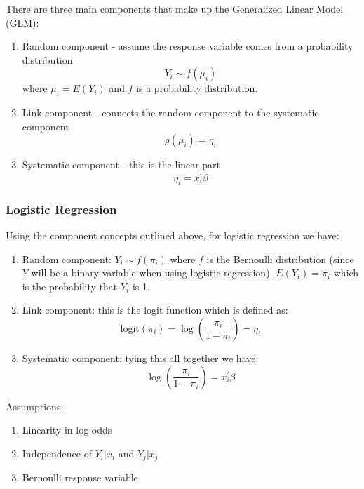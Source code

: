 
There are three main components that make up the Generalized Linear Model (GLM):

\begin{enumerate}
\item Random component - assume the response variable comes from a probability distribution
\begin{equation}
Y_i \sim f(\mu_i)
\end{equation}
where $\mu_i = E(Y_i)$ and $f$ is a probability distribution.
\item Link component - connects the random component to the systematic component
\begin{equation}
g(\mu_i)=\eta_i
\end{equation}
\item Systematic component - this is the linear part
\begin{equation}
\eta_i = x_i^\prime \beta
\end{equation}

\end{enumerate}


\subsubsection{Logistic Regression}

Using the component concepts outlined above, for logistic regression we have:

\begin{enumerate}
\item Random component: $Y_i \sim f(\pi_i)$ where $f$ is the Bernoulli distribution (since $Y$ will be a binary variable when using logistic regression). $E(Y_i) = \pi_i $ which is the probability that $Y_i$ is 1.
\item Link component: this is the logit function which is defined as:
\begin{equation}
\text{logit}(\pi_i) = \log \left(\frac{\pi_i}{1-\pi_i} \right) = \eta_i
\end{equation}
\item Systematic component: tying this all together we have:
\begin{equation}
\log \left(\frac{\pi_i}{1-\pi_i}\right) = x_i^\prime \beta
\end{equation}
\end{enumerate}

Assumptions:
\begin{enumerate}
\item Linearity in log-odds
\item Independence of $Y_i|x_i$ and $Y_j|x_j$
\item Bernoulli response variable
\end{enumerate}

